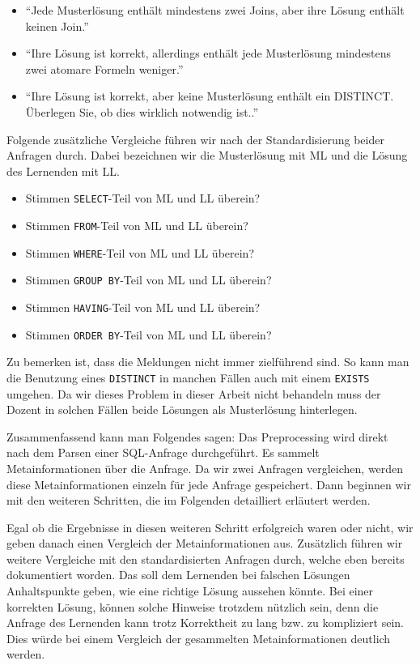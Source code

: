 \begin{itemize}
\item ``Jede Musterlösung enthält mindestens zwei Joins, aber ihre Lösung enthält keinen Join.''
\item ``Ihre Lösung ist korrekt, allerdings enthält jede Musterlösung mindestens zwei atomare Formeln weniger.''
\item ``Ihre Lösung ist korrekt, aber keine Musterlösung enthält ein DISTINCT. Überlegen Sie, ob dies wirklich notwendig ist..'' 
\end{itemize}

Folgende zusätzliche Vergleiche führen wir nach der Standardisierung beider Anfragen durch. Dabei bezeichnen wir die Musterlösung mit ML und die Lösung des Lernenden mit LL.

\begin{itemize}
\item Stimmen \verb|SELECT|-Teil von ML und LL überein?
\item Stimmen \verb|FROM|-Teil von ML und LL überein?
\item Stimmen \verb|WHERE|-Teil von ML und LL überein?
\item Stimmen \verb|GROUP BY|-Teil von ML und LL überein?
\item Stimmen \verb|HAVING|-Teil von ML und LL überein?
\item Stimmen \verb|ORDER BY|-Teil von ML und LL überein?
\end{itemize}

Zu bemerken ist, dass die Meldungen nicht immer zielführend sind. So kann man die Benutzung eines \verb|DISTINCT| in manchen Fällen auch mit einem \verb|EXISTS| umgehen. Da wir dieses Problem in dieser Arbeit nicht behandeln muss der Dozent in solchen Fällen beide Lösungen als Musterlösung hinterlegen.

Zusammenfassend kann man Folgendes sagen: Das Preprocessing wird direkt nach dem Parsen einer SQL-Anfrage durchgeführt. Es sammelt Metainformationen über die Anfrage. Da wir zwei Anfragen vergleichen, werden diese Metainformationen einzeln für jede Anfrage gespeichert. Dann beginnen wir mit den weiteren Schritten, die im Folgenden detailliert erläutert werden.

Egal ob die Ergebnisse in diesen weiteren Schritt erfolgreich waren oder nicht, wir geben danach einen Vergleich der Metainformationen aus. Zusätzlich führen wir weitere Vergleiche mit den standardisierten Anfragen durch, welche eben bereits dokumentiert worden. Das soll dem Lernenden bei falschen Lösungen Anhaltspunkte geben, wie eine richtige Lösung aussehen könnte. Bei einer korrekten Lösung, können solche Hinweise trotzdem nützlich sein, denn die Anfrage des Lernenden kann trotz Korrektheit zu lang bzw. zu kompliziert sein. Dies würde bei einem Vergleich der gesammelten Metainformationen deutlich werden.


